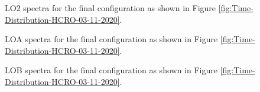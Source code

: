 \documentclass[12pt]{article}
\begin{document}
%
\begin{figure}[ht!]
\caption{LO2 spectra for the final configuration as shown in Figure \ref{fig:Time-Distribution-HCRO-03-11-2020}.}
\label{fig:10MHZ-TEST-LOA-ALL-CLK}
\end{figure}
%
%
\begin{figure}[ht!]
\caption{LOA spectra for the final configuration as shown in Figure \ref{fig:Time-Distribution-HCRO-03-11-2020}.}
\label{fig:10MHZ-TEST-LOA-ALL-CLK}
\end{figure}
%
%
\begin{figure}[ht!]
\caption{LOB spectra for the final configuration as shown in Figure \ref{fig:Time-Distribution-HCRO-03-11-2020}.}
\label{fig:10MHZ-TEST-LOB-ALL-CLK}
\end{figure}
\end{document}
